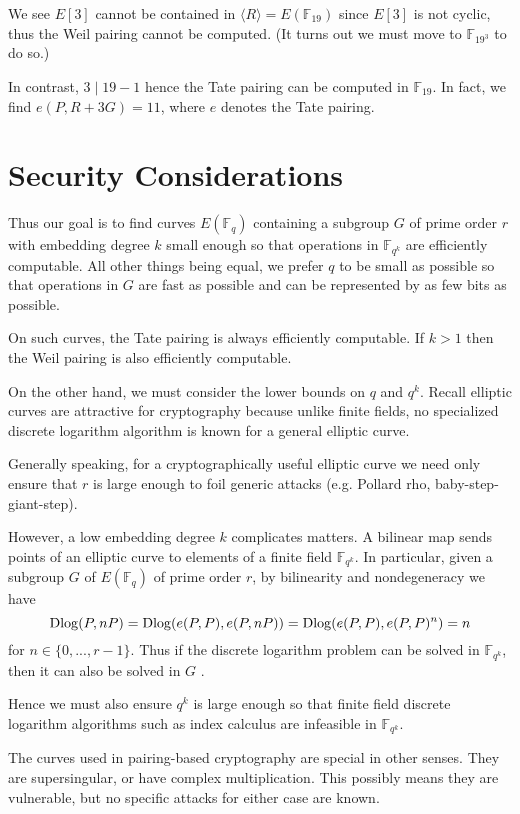We see $E[3]$ cannot be contained in $\langle R \rangle = E(\mathbb{F}_{19})$
since $E[3]$ is not cyclic, thus the Weil pairing cannot be computed.
(It turns out we must move to $\mathbb{F}_{19^3}$ to do so.)

In contrast, $3 \mid 19-1$ hence the Tate pairing can be
computed in $\mathbb{F}_{19}$. In fact, we find $e(P, R + 3G) = 11$, where
$e$ denotes the Tate pairing.

\section { Security Considerations }

Thus our goal is to find curves $E(\mathbb{F}_q)$ containing a subgroup
$G$ of prime order $r$ with embedding degree $k$ small enough so that
operations in $\mathbb{F}_{q^k}$ are efficiently computable.
All other things being equal, we prefer $q$ to be small as possible so
that operations in $G$ are fast as possible and can be represented by
as few bits as possible.

On such curves, the Tate pairing is always efficiently computable.
If $k > 1$ then the Weil pairing is also efficiently computable.

On the other hand, we must consider the lower bounds on $q$ and $q^k$.
Recall elliptic curves are attractive for cryptography
because unlike finite fields,
no specialized discrete logarithm algorithm is known for a general elliptic
curve.

Generally speaking, for a cryptographically useful elliptic curve
we need only ensure that $r$ is large enough to foil generic attacks
(e.g. Pollard rho, baby-step-giant-step).

However, a low embedding degree $k$ complicates matters. A bilinear map
sends points of an elliptic curve to elements of a finite field
$\mathbb{F}_{q^k}$. In particular, given a subgroup $G$ of $E(\mathbb{F}_q)$
of prime order $r$, by bilinearity and nondegeneracy we have
\[ \mathop{\rm Dlog} (P, nP) = \mathop{\rm Dlog} ( e(P,P), e(P, nP) )
= \mathop{\rm Dlog} (e(P,P),e(P,P)^n) = n \]
for $n \in \{0,...,r-1\}$.
Thus if the discrete logarithm problem can be solved
in $\mathbb{F}_{q^k}$, then it can also be solved in $G$ \cite{mov,fr}.

Hence we must also ensure $q^k$ is large enough so that
finite field discrete logarithm algorithms such as index calculus are
infeasible in $\mathbb{F}_{q^k}$.

The curves used in pairing-based cryptography are special in other senses.
They are supersingular, or have complex multiplication. This possibly means
they are vulnerable, but no specific attacks for either case are known.

